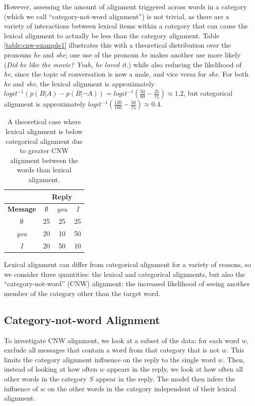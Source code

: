 \documentclass[11pt]{article}
\begin{document}
However, assessing the amount of alignment triggered across words in a category (which we call ``category-not-word alignment'') is not trivial, as there are a variety of interactions between lexical items within a category that can cause the lexical alignment to actually be less than the category alignment. Table \ref{table:cnw-example1} illustrates this with a theoretical distribution over the pronouns \textit{he} and \textit{she}; one use of the pronoun \textit{he} makes another use more likely (\textit{Did he like the movie? Yeah, he loved it.}) while also reducing the likelihood of \textit{he}, since the topic of conversation is now a male, and vice versa for \textit{she}. For both \textit{he} and \textit{she}, the lexical alignment is approximately $logit^{-1}(p(B|A)-p(B|\neg A)) = logit^{-1}(\frac{50}{80}-\frac{25}{75}) \approx 1.2$, but categorical alignment is approximately $logit^{-1}(\frac{120}{160}-\frac{50}{75}) \approx 0.4$. 

\begin{table}[h]
\begin{center}
\begin{tabular}{|c||c|c|c|}
\hline 
& \multicolumn{3}{|c|}{\bf Reply} \\ 
\hline
\bf Message & $\emptyset$ & \textit{you} & \textit{I} \\ \hline
$\emptyset$ & 25 & 25 & 25\\
\textit{you} & 20 & 10 & 50 \\
\textit{I} & 20 & 50 & 10 \\
\hline
\end{tabular}
\end{center}
\caption{\label{table:cnw-example2} A theoretical case where lexical alignment is below categorical alignment due to greater CNW alignment between the words than lexical alignment.}
\end{table}

Lexical alignment can differ from categorical alignment for a variety of reasons, so we consider three quantities: the lexical and categorical alignments, but also the ``category-not-word'' (CNW) alignment: the increased likelihood of seeing another member of the category other than the target word.

\subsection{Category-not-word Alignment}

To investigate CNW alignment, we look at a subset of the data: for each word $w$, exclude all messages that contain a word from that category that is not $w$. This limits the category alignment influence on the reply to the single word $w$. Then, instead of looking at how often $w$ appears in the reply, we look at how often all other words in the category $S$ appear in the reply.  The model then infers the influence of $w$ on the other words in the category independent of their lexical alignment.
\end{document}

